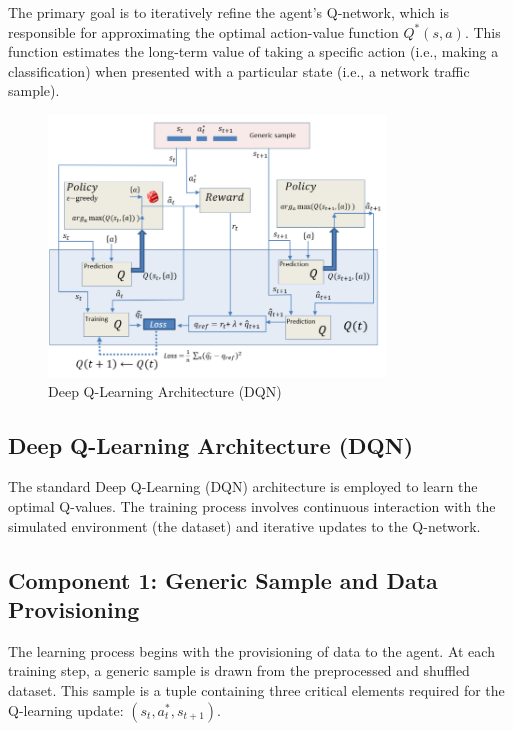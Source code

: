 \documentclass[12pt]{report}
\begin{document}
The primary goal is to iteratively refine the agent’s Q-network, which is responsible for approximating the optimal action-value function \( Q^*(s, a) \). This function estimates the long-term value of taking a specific action (i.e., making a classification) when presented with a particular state (i.e., a network traffic sample).


\begin{figure}[htbp]
    \centering
    \includegraphics[width=0.8\textwidth]{images/dqn-arch.png}
    \caption{Deep Q-Learning Architecture (DQN)}
    \label{fig:dqn-arch}
\end{figure}


\subsection{Deep Q-Learning Architecture (DQN)}

The standard Deep Q-Learning (DQN) architecture is employed to learn the optimal Q-values. The training process involves continuous interaction with the simulated environment (the dataset) and iterative updates to the Q-network.

\subsection{Component 1: Generic Sample and Data Provisioning}

The learning process begins with the provisioning of data to the agent. At each training step, a generic sample is drawn from the preprocessed and shuffled dataset. This sample is a tuple containing three critical elements required for the Q-learning update: \( (s_t, a^*_t, s_{t+1}) \).
\end{document}
